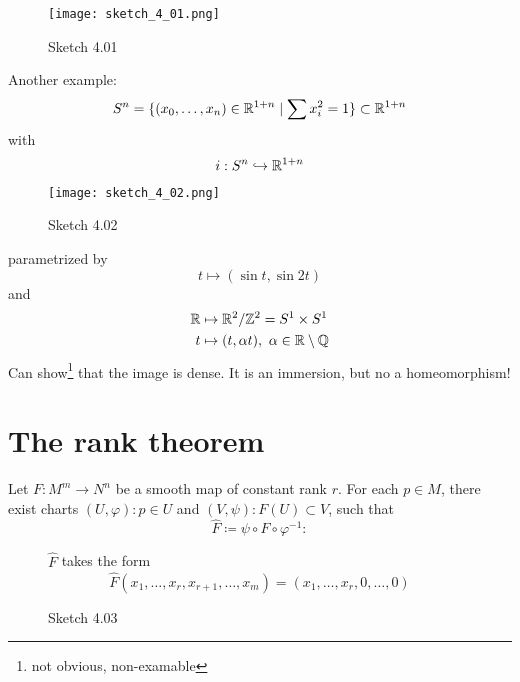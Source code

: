 \begin{example}
    \begin{figure}[H]
        \centering
        \texttt{[image: sketch\_4\_01.png]}
        \caption{Sketch 4.01}
    \end{figure}
    Another example: \[S^n=\{(x_0,\dots,x_n)\in\mathbb{R}^{1+n}\mid\sum x_i^2=1\}\subset\mathbb{R}^{1+n}\]
    with \[i:S^n\hookrightarrow \mathbb{R}^{1+n}\]

    \begin{figure}[H]
        \centering
        \texttt{[image: sketch\_4\_02.png]}
        \caption{Sketch 4.02}
    \end{figure}
    parametrized by \[t\mapsto (\sin t,\sin 2t)\]
    and 
    \begin{align*}
        \mathbb{R}&\mapsto \mathbb{R}^2/\mathbb{Z}^2=S^1\times S^1\\
        t&\mapsto (t,\alpha t),\text{   } \alpha \in\mathbb{R}\setminus \mathbb{Q} 
    \end{align*}
    Can show\footnote{not obvious, non-examable} that the image is dense. It is an immersion, but no a homeomorphism!
\end{example}


\section{The rank theorem}

\begin{theorem}\label{thm:4.3} Let \(F:M^m\to N^n\) be a smooth map of 
    constant rank \(r\). For each \(p\in M\), there exist charts \((U,\varphi):p\in U\) and \((V,\psi):F(U)\subset V\),
    such that \[\hat{F}\coloneqq \psi \circ F\circ\varphi^{-1}:\]
    \begin{figure}[H]
        \centering
        \caption{Sketch 4.03}
        \(\hat{F}\) takes the form 
        \[\hat{F}(x_1,\dots,x_r,x_{r+1},\dots,x_m)=(x_1,\dots,x_r,0,\dots,0)\]
    \end{figure} 
    
\end{theorem}

